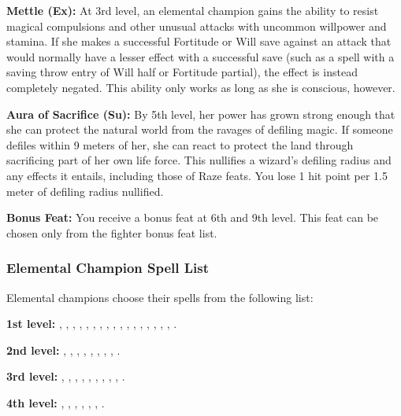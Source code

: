 {\textbf{Mettle (Ex):} At 3rd level, an elemental champion gains the ability to resist magical compulsions and other unusual attacks with uncommon willpower and stamina. If she makes a successful Fortitude or Will save against an attack that would normally have a lesser effect with a successful save (such as a spell with a saving throw entry of Will half or Fortitude partial), the effect is instead completely negated. This ability only works as long as she is conscious, however.

\textbf{Aura of Sacrifice (Su):} By 5th level, her power has grown strong enough that she can protect the natural world from the ravages of defiling magic. If someone defiles within 9 meters of her, she can react to protect the land through sacrificing part of her own life force. This nullifies a wizard's defiling radius and any effects it entails, including those of Raze feats. You lose 1 hit point per 1.5 meter of defiling radius nullified.

\textbf{Bonus Feat:} You receive a bonus feat at 6th and 9th level. This feat can be chosen only from the fighter bonus feat list.

\subsubsection{Elemental Champion Spell List}
Elemental champions choose their spells from the following list:

\textbf{1st level:} , , , , , , , , , , , , , , , , , .

\textbf{2nd level:} , , , , , , , , .

\textbf{3rd level:} , , , , , , , , , .

\textbf{4th level:} , , , , , , .

}
